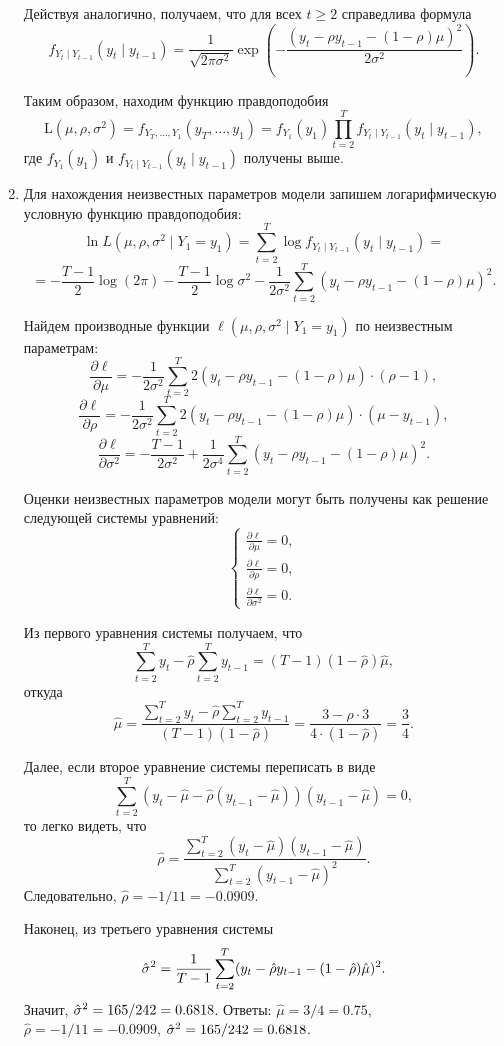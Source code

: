 \begin{problem}
\begin{sol}
\begin{enumerate}
Действуя аналогично, получаем, что для всех $t \geq 2$ справедлива формула
\[
f_{Y_{t} \mid Y_{t-1}}(y_{t} \mid y_{t-1}) = \frac{1}{\sqrt{2\pi\sigma^2}}\exp{\left(-\frac{(y_{t} - \rho y_{t-1} - (1- \rho) \mu)^2}{2\sigma^2}\right)}.
\]

Таким образом, находим функцию правдоподобия
\[
\mathrm{L}(\mu, \rho, \sigma^2) = f_{Y_T,\ldots,Y_1}(y_T,\dots,y_1) = f_{Y_1}(y_1)\prod_{t=2}^{T}f_{Y_t \mid Y_{t-1}}(y_t \mid y_{t-1}) ,
\]
где $f_{Y_1}(y_1)$ и $f_{Y_t \mid Y_{t-1}}(y_t \mid y_{t-1})$ получены выше.

\item Для нахождения неизвестных параметров модели запишем логарифмическую условную функцию правдоподобия:
\[
\ln L(\mu, \rho, \sigma^2 \mid Y_1 = y_1) = \sum_{t=2}^{T}\log{f_{Y_t \mid Y_{t-1}}(y_t \mid y_{t-1})} =
\]
\[
=-\frac{T-1}{2} \log(2 \pi) - \frac{T-1}{2} \log{\sigma^2} - \frac{1}{2\sigma^2} \sum_{t=2}^{T}(y_t - \rho y_{t-1} - (1 - \rho) \mu)^2 .
\]

Найдем производные функции $\ell(\mu, \rho, \sigma^2 \mid Y_1 = y_1)$ по неизвестным параметрам:
\[
\frac{\partial \ell}{\partial \mu} = -\frac{1}{2\sigma^2} \sum_{t=2}^{T} 2(y_t - \rho y_{t-1} - (1 - \rho) \mu) \cdot (\rho - 1) ,
\]
\[
\frac{\partial \ell}{\partial \rho} = -\frac{1}{2\sigma^2} \sum_{t=2}^{T} 2(y_t - \rho y_{t-1} - (1 - \rho) \mu) \cdot (\mu - y_{t-1}) ,
\]
\[
\frac{\partial \ell}{\partial {\sigma^2}} =  - \frac{T-1}{2\sigma^2} + \frac{1}{2\sigma^4} \sum_{t=2}^{T}(y_t - \rho y_{t-1} - (1 - \rho) \mu)^2 .
\]

Оценки неизвестных параметров модели могут быть получены как решение следующей системы уравнений:
\[
\begin{cases}
    \frac{\partial \ell}{\partial \mu} = 0, \\
    \frac{\partial \ell}{\partial \rho} = 0,\\
    \frac{\partial \ell}{\partial {\sigma^2}} = 0.
\end{cases}
\]

Из первого уравнения системы получаем, что
\[
\sum_{t=2}^{T}y_{t} - \hat{\rho} \sum_{t=2}^{T}y_{t-1} = (T - 1) (1- \hat{\rho}) \hat{\mu} ,
\]
откуда
\[
\hat{\mu} = \frac{\sum_{t=2}^{T}y_{t} - \hat{\rho} \sum_{t=2}^{T}y_{t-1}}{(T - 1) (1- \hat{\rho})} = \frac{3 - \hat{\rho} \cdot 3}{4\cdot(1-\hat{\rho})} = \frac{3}{4} .
\]

Далее, если второе уравнение системы переписать в виде
\[
\sum_{t=2}^{T}(y_t - \hat{\mu} - \hat{\rho} (y_{t-1} - \hat{\mu}))(y_{t-1} - \hat{\mu}) = 0 ,
\]
то легко видеть, что
\[
\hat{\rho} = \frac{\sum_{t=2}^{T}(y_t - \hat{\mu})(y_{t-1} - \hat{\mu})}{\sum_{t=2}^{T}(y_{t-1} - \hat{\mu})^2} .
\]
Следовательно, $\hat{\rho} =-1/11= -0.0909$.

Наконец, из третьего уравнения системы
\[
\hat{\sigma}^2 =\frac{1}{T-1} \sum_{t=2}^{T}(y_t - \hat{\rho} y_{t-1} - (1 - \hat{\rho}) \hat{\mu})^2 .
\]
Значит, $\hat{\sigma}^2 = 165/242= 0.6818$. Ответы: $\hat{\mu} = 3/4= 0.75$, $\hat{\rho} = -1/11=-0.0909$, $\hat{\sigma}^2 =165/242=0.6818$.
\end{enumerate}
\end{sol}
\end{problem}




